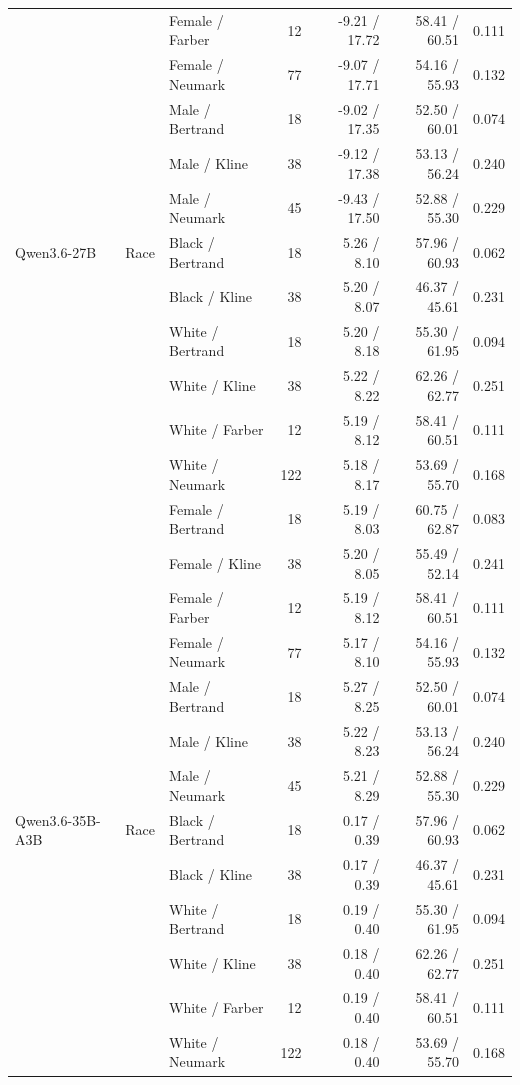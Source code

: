 \begin{longtable}{@{}lllrrrr@{}}
 &  & Female / Farber & 12 & -9.21 / 17.72 & 58.41 / 60.51 & 0.111 \\
 &  & Female / Neumark & 77 & -9.07 / 17.71 & 54.16 / 55.93 & 0.132 \\
 &  & Male / Bertrand & 18 & -9.02 / 17.35 & 52.50 / 60.01 & 0.074 \\
 &  & Male / Kline & 38 & -9.12 / 17.38 & 53.13 / 56.24 & 0.240 \\
 &  & Male / Neumark & 45 & -9.43 / 17.50 & 52.88 / 55.30 & 0.229 \\
\addlinespace
Qwen3.6-27B & Race & Black / Bertrand & 18 & 5.26 / 8.10 & 57.96 / 60.93 & 0.062 \\
 &  & Black / Kline & 38 & 5.20 / 8.07 & 46.37 / 45.61 & 0.231 \\
 &  & White / Bertrand & 18 & 5.20 / 8.18 & 55.30 / 61.95 & 0.094 \\
 &  & White / Kline & 38 & 5.22 / 8.22 & 62.26 / 62.77 & 0.251 \\
 &  & White / Farber & 12 & 5.19 / 8.12 & 58.41 / 60.51 & 0.111 \\
 &  & White / Neumark & 122 & 5.18 / 8.17 & 53.69 / 55.70 & 0.168 \\
 &  & Female / Bertrand & 18 & 5.19 / 8.03 & 60.75 / 62.87 & 0.083 \\
 &  & Female / Kline & 38 & 5.20 / 8.05 & 55.49 / 52.14 & 0.241 \\
 &  & Female / Farber & 12 & 5.19 / 8.12 & 58.41 / 60.51 & 0.111 \\
 &  & Female / Neumark & 77 & 5.17 / 8.10 & 54.16 / 55.93 & 0.132 \\
 &  & Male / Bertrand & 18 & 5.27 / 8.25 & 52.50 / 60.01 & 0.074 \\
 &  & Male / Kline & 38 & 5.22 / 8.23 & 53.13 / 56.24 & 0.240 \\
 &  & Male / Neumark & 45 & 5.21 / 8.29 & 52.88 / 55.30 & 0.229 \\
\addlinespace
Qwen3.6-35B-A3B & Race & Black / Bertrand & 18 & 0.17 / 0.39 & 57.96 / 60.93 & 0.062 \\
 &  & Black / Kline & 38 & 0.17 / 0.39 & 46.37 / 45.61 & 0.231 \\
 &  & White / Bertrand & 18 & 0.19 / 0.40 & 55.30 / 61.95 & 0.094 \\
 &  & White / Kline & 38 & 0.18 / 0.40 & 62.26 / 62.77 & 0.251 \\
 &  & White / Farber & 12 & 0.19 / 0.40 & 58.41 / 60.51 & 0.111 \\
 &  & White / Neumark & 122 & 0.18 / 0.40 & 53.69 / 55.70 & 0.168 \\

\end{longtable}
